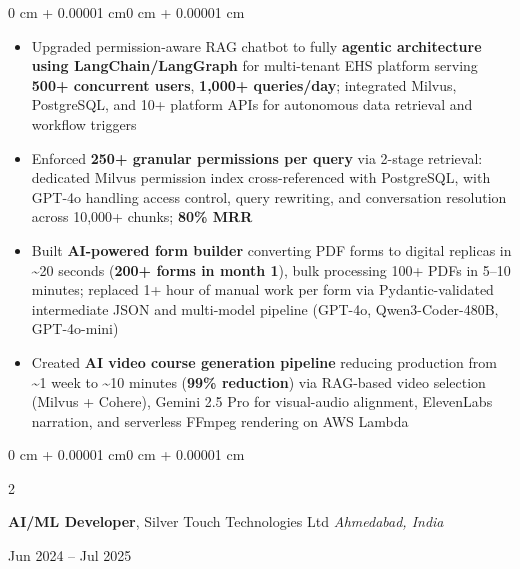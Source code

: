 \documentclass[10pt, letterpaper]{article}
\newenvironment{highlights}{
    \begin{itemize}[
        topsep=0.01 cm,
        parsep=0.01 cm,
        partopsep=0pt,
        itemsep=0pt,
        leftmargin=0 cm + 10pt
    ]
}{
    \end{itemize}
}
\newenvironment{onecolentry}{
    \begin{adjustwidth}{0 cm + 0.00001 cm}{0 cm + 0.00001 cm}
}{
    \end{adjustwidth}
}
\newenvironment{twocolentry}[2][]{
    \onecolentry
    \def\secondColumn{#2}
    \setcolumnwidth{\fill, 5.5 cm}
    \begin{paracol}{2}
}{
    \switchcolumn \raggedleft \secondColumn
    \end{paracol}
    \endonecolentry
}
\begin{document}
        \vspace{0.02 cm}
        \begin{onecolentry}
            \begin{highlights}
                \item Upgraded permission-aware RAG chatbot to fully \textbf{agentic architecture using LangChain/LangGraph} for multi-tenant EHS platform serving \textbf{500+ concurrent users}, \textbf{1,000+ queries/day}; integrated Milvus, PostgreSQL, and 10+ platform APIs for autonomous data retrieval and workflow triggers
                \item Enforced \textbf{250+ granular permissions per query} via 2-stage retrieval: dedicated Milvus permission index cross-referenced with PostgreSQL, with GPT-4o handling access control, query rewriting, and conversation resolution across 10,000+ chunks; \textbf{80\% MRR}
                \item Built \textbf{AI-powered form builder} converting PDF forms to digital replicas in \textasciitilde20 seconds (\textbf{200+ forms in month 1}), bulk processing 100+ PDFs in 5--10 minutes; replaced 1+ hour of manual work per form via Pydantic-validated intermediate JSON and multi-model pipeline (GPT-4o, Qwen3-Coder-480B, GPT-4o-mini)
                \item Created \textbf{AI video course generation pipeline} reducing production from \textasciitilde1 week to \textasciitilde10 minutes (\textbf{99\% reduction}) via RAG-based video selection (Milvus + Cohere), Gemini 2.5 Pro for visual-audio alignment, ElevenLabs narration, and serverless FFmpeg rendering on AWS Lambda
            \end{highlights}
        \end{onecolentry}

        \vspace{0.05 cm}

        \begin{twocolentry}{
            Jun 2024 -- Jul 2025
        }
            \textbf{AI/ML Developer}, Silver Touch Technologies Ltd \hfill \textit{Ahmedabad, India}
        \end{twocolentry}
\end{document}

